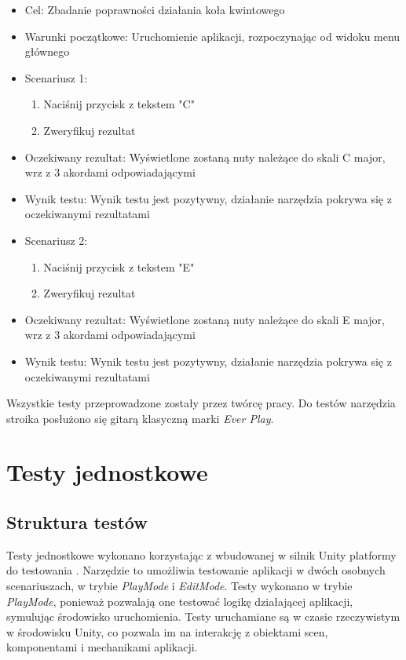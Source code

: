 \begin{itemize}
    \item Cel: Zbadanie poprawności działania koła kwintowego
    \item Warunki początkowe: Uruchomienie aplikacji, rozpoczynając od widoku menu głównego
    \item Scenariusz 1:
        \begin{enumerate}
            \item Naciśnij przycisk z tekstem "C"
            \item Zweryfikuj rezultat
        \end{enumerate}
    \item Oczekiwany rezultat: Wyświetlone zostaną nuty należące do skali C major, wrz z 3 akordami odpowiadającymi 
    \item Wynik testu: Wynik testu jest pozytywny, działanie narzędzia pokrywa się z oczekiwanymi rezultatami
    \item Scenariusz 2:
        \begin{enumerate}
            \item Naciśnij przycisk z tekstem "E"
            \item Zweryfikuj rezultat
        \end{enumerate}
    \item Oczekiwany rezultat: Wyświetlone zostaną nuty należące do skali E major, wrz z 3 akordami odpowiadającymi 
    \item Wynik testu: Wynik testu jest pozytywny, działanie narzędzia pokrywa się z oczekiwanymi rezultatami
\end{itemize}

Wszystkie testy przeprowadzone zostały przez twórcę pracy. Do testów narzędzia stroika posłużono się gitarą klasyczną marki \emph{Ever Play}.
\section{Testy jednostkowe}

\subsection{Struktura testów}

Testy jednostkowe wykonano korzystając z wbudowanej w silnik Unity platformy do testowania \cite{UnityTestFramework}. Narzędzie to umożliwia testowanie aplikacji w dwóch osobnych scenariuszach, w trybie \emph{PlayMode} i \emph{EditMode}. Testy wykonano w trybie \emph{PlayMode}, ponieważ pozwalają one testować logikę działającej aplikacji, symulując środowisko uruchomienia. Testy uruchamiane są w czasie rzeczywistym w środowisku Unity, co pozwala im na interakcję z obiektami scen, komponentami i mechanikami aplikacji.

